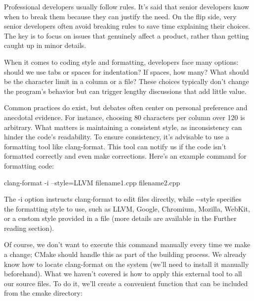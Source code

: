 Professional developers usually follow rules. It’s said that senior developers know when to break them because they can justify the need. On the flip side, very senior developers often avoid breaking rules to save time explaining their choices. The key is to focus on issues that genuinely affect a product, rather than getting caught up in minor details.

When it comes to coding style and formatting, developers face many options: should we use tabs or spaces for indentation? If spaces, how many? What should be the character limit in a column or a file? These choices typically don’t change the program’s behavior but can trigger lengthy discussions that add little value.

Common practices do exist, but debates often center on personal preference and anecdotal evidence. For instance, choosing 80 characters per column over 120 is arbitrary. What matters is maintaining a consistent style, as inconsistency can hinder the code’s readability. To ensure consistency, it’s advisable to use a formatting tool like clang-format. This tool can notify us if the code isn’t formatted correctly and even make corrections. Here’s an example command for formatting code:

\begin{shell}
clang-format -i --style=LLVM filename1.cpp filename2.cpp
\end{shell}


The -i option instructs clang-format to edit files directly, while -{}-style specifies the formatting style to use, such as LLVM, Google, Chromium, Mozilla, WebKit, or a custom style provided in a file (more details are available in the Further reading section).

Of course, we don’t want to execute this command manually every time we make a change; CMake should handle this as part of the building process. We already know how to locate clang-format on the system (we’ll need to install it manually beforehand). What we haven’t covered is how to apply this external tool to all our source files. To do it, we’ll create a convenient function that can be included from the cmake directory:



